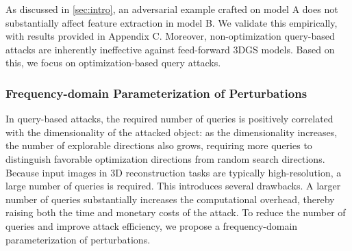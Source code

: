 \documentclass[runningheads]{llncs}
\begin{document}
As discussed in \cref{sec:intro}, an adversarial example crafted on model A does not substantially affect feature extraction in model B. We validate this empirically, with results provided in Appendix C. Moreover, non-optimization query-based attacks are inherently ineffective against feed-forward 3DGS models. Based on this, we focus on optimization-based query attacks.

\subsubsection{Frequency-domain Parameterization of Perturbations}
In query-based attacks, the required number of queries is positively correlated with the dimensionality of the attacked object: as the dimensionality increases, the number of explorable directions also grows, requiring more queries to distinguish favorable optimization directions from random search directions. Because input images in 3D reconstruction tasks are typically high-resolution, a large number of queries is required. This introduces several drawbacks. A larger number of queries substantially increases the computational overhead, thereby raising both the time and monetary costs of the attack. To reduce the number of queries and improve attack efficiency, we propose a frequency-domain parameterization of perturbations.
\end{document}
